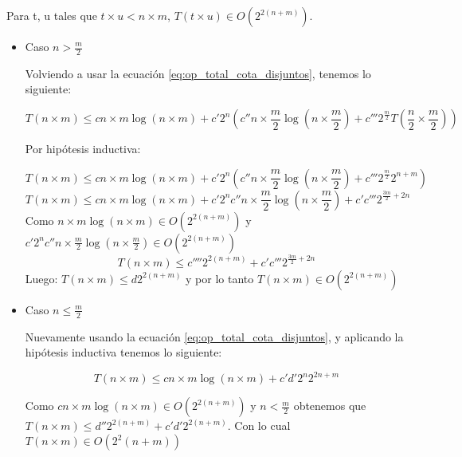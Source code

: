 \documentclass[a4paper, 12pt] {article}
\begin{document}
Para t, u tales que $ t \times u < n \times m $, $ T(t \times u) \in O\left( 2^{2\left( n + m\right) }\right) $.
\begin{itemize}
 \item Caso $n > \frac{m}{2} $

Volviendo a usar la ecuaci\'on \ref{eq:op_total_cota_disjuntos}, tenemos lo siguiente: 

\begin{equation}
T\left( n \times m \right) \leq c n\times m \log \left(n\times m \right) + c' 2^{n}\left( c'' n\times \frac{m}{2} \log \left( n \times \frac{m}{2} \right) + c''' 2^{\frac{m}{2}}T\left( \frac{n}{2} \times \frac{m}{2} \right) \right)
\end{equation}



Por hip\'otesis inductiva:


\begin{equation}
T\left( n \times m \right) \leq c n\times m \log \left(n\times m \right) + c' 2^{n}\left( c'' n\times \frac{m}{2} \log \left( n \times \frac{m}{2} \right) + c''' 2^{\frac{m}{2}} 2^{n+m} \right)
\end{equation}
\begin{equation}
T\left( n \times m \right) \leq c n\times m \log \left(n\times m \right) +  c' 2^{n}c'' n\times \frac{m}{2} \log \left( n \times \frac{m}{2} \right) + c'c''' 2^{\frac{3m}{2} + 2n}  
\end{equation}
Como $n\times m \log \left(n\times m \right) \in O\left(2^{2\left(n+m\right)}\right)$ y $ c' 2^{n}c'' n\times \frac{m}{2} \log \left( n \times \frac{m}{2} \right) \in O\left(2^{2\left(n+m\right)}\right)$
\begin{equation}
T\left( n \times m \right) \leq c'''' 2^{2\left(n+m\right)}+ c'c''' 2^{\frac{3m}{2} + 2n}  
\end{equation}
Luego:
$T\left( n \times m \right) \leq d 2^{2\left(n+m\right)}$ y por lo tanto $T\left( n\times m \right) \in O\left( 2^{2\left(n+m\right)}\right)$



\item Caso $n \leq \frac{m}{2}$

Nuevamente usando la ecuaci\'on \ref{eq:op_total_cota_disjuntos}, y aplicando la hip\'otesis inductiva tenemos lo siguiente: 

\begin{equation}
T\left( n \times m \right) \leq c n\times m \log \left(n\times m \right) + c'd' 2^{n}2^{2n+m}
\end{equation}


Como $ c n\times m \log \left(n\times m \right) \in O\left( 2^{2\left( n+m\right)}\right)$ y $ n < \frac{m}{2} $ obtenemos que $ T\left( n \times m \right) \leq d''2^{ 2\left( n+m \right)} + c'd' 2^{2\left(n+m \right)}$. Con lo cual $ T\left(n \times m \right) \in O\left(2^2\left( n+m\right) \right)$ 


\end{itemize}
\end{document}
